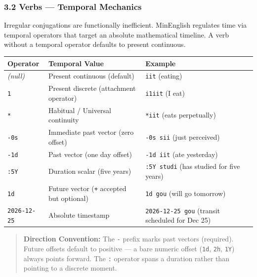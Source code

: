 \subsubsection{3.2 Verbs --- Temporal
Mechanics}\label{verbs-temporal-mechanics}

Irregular conjugations are functionally inefficient. MinEnglish
regulates time via temporal operators that target an absolute
mathematical timeline. A verb without a temporal operator defaults to
present continuous.

{\def\LTcaptype{} %
\begin{longtable}[]{@{}
  >{\raggedright\arraybackslash}p{}
  >{\raggedright\arraybackslash}p{}
  >{\raggedright\arraybackslash}p{}@{}}
\toprule\noalign{}
\begin{minipage}[b]{\linewidth}\raggedright
Operator
\end{minipage} & \begin{minipage}[b]{\linewidth}\raggedright
Temporal Value
\end{minipage} & \begin{minipage}[b]{\linewidth}\raggedright
Example
\end{minipage} \\
\midrule\noalign{}
\endhead
\bottomrule\noalign{}
\endlastfoot
\emph{(null)} & Present continuous (default) & \texttt{iit} (eating) \\
\texttt{1} & Present discrete (attachment operator) & \texttt{i1iit} (I
eat) \\
\texttt{*} & Habitual / Universal continuity & \texttt{*iit} (eats
perpetually) \\
\texttt{-0s} & Immediate past vector (zero offset) & \texttt{-0s\ sii}
(just perceived) \\
\texttt{-1d} & Past vector (one day offset) & \texttt{-1d\ iit} (ate
yesterday) \\
\texttt{:5Y} & Duration scalar (five years) & \texttt{:5Y\ studi} (has
studied for five years) \\
\texttt{1d} & Future vector (\texttt{+} accepted but optional) &
\texttt{1d\ gou} (will go tomorrow) \\
\texttt{2026-12-25} & Absolute timestamp & \texttt{2026-12-25\ gou}
(transit scheduled for Dec 25) \\
\end{longtable}
}

\begin{quote}
\textbf{Direction Convention:} The \texttt{-} prefix marks past vectors
(required). Future offsets default to positive --- a bare numeric offset
(\texttt{1d}, \texttt{2h}, \texttt{1Y}) always points forward. The
\texttt{:} operator spans a duration rather than pointing to a discrete
moment.
\end{quote}

